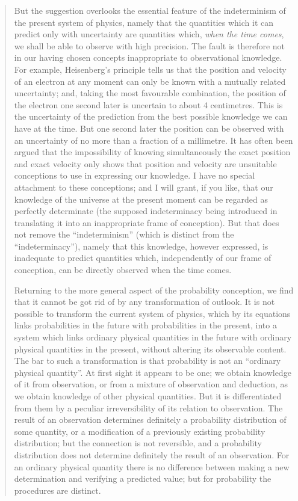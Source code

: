\begin{quote}
    But the suggestion overlooks the essential feature of the indeterminism of the present system of physics, namely that the quantities which it can predict only with uncertainty are quantities which, \emph{when the time comes}, we shall be able to observe with high precision.  The fault is therefore not in our having chosen concepts inappropriate to observational knowledge.  For example, Heisenberg's principle tells us that the position and velocity of an electron at any moment can only be known with a mutually related uncertainty; and, taking the most favourable combination, the position of the electron one second later is uncertain to about 4 centimetres.  This is the uncertainty of the prediction from the best possible knowledge we can have at the time.  But one second later the position can be observed with an uncertainty of no more than a fraction of a millimetre.  It has often been argued that the impossibility of knowing simultaneously the exact position and exact velocity only shows that position and velocity are unsuitable conceptions to use in expressing our knowledge.  I have no special attachment to these conceptions; and I will grant, if you like, that our knowledge of the universe at the present moment can be regarded as perfectly determinate (the supposed indeterminacy being introduced in translating it into an inappropriate frame of conception).  But that does not remove the ``indeterminism'' (which is distinct from the ``indeterminacy''), namely that this knowledge, however expressed, is inadequate to predict quantities which, independently of our frame of conception, can be directly observed when the time comes.  
    
    Returning to the more general aspect of the probability conception, we find that it cannot be got rid of by any transformation of outlook.  It is not possible to transform the current system of physics, which by its equations links probabilities in the future with probabilities in the present, into a system which links ordinary physical quantities in the future with ordinary physical quantities in the present, without altering its observable content.  The bar to such a transformation is that probability is not an ``ordinary physical quantity''.  At first sight it appears to be one; we obtain knowledge of it from observation, or from a mixture of observation and deduction, as we obtain knowledge of other physical quantities.  But it is differentiated from them by a peculiar irreversibility of its relation to observation.  The result of an observation determines definitely a probability distribution of some quantity, or a modification of a previously existing probability distribution; but the connection is not reversible, and a probability distribution does not determine definitely the result of an observation.  For an ordinary physical quantity there is no difference between making a new determination and verifying a predicted value; but for probability the procedures are distinct.  


\end{quote}
